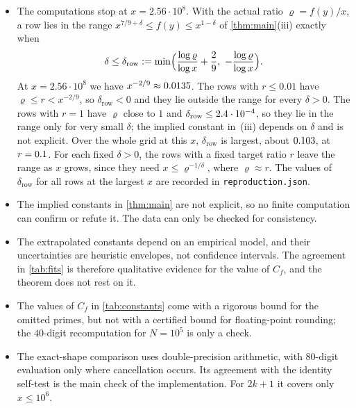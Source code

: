 \begin{itemize}
\item The computations stop at $x=2.56\cdot10^8$. With the actual ratio $\varrho=f(y)/x$, a row lies in the range $x^{7/9+\delta}\le f(y)\le x^{1-\delta}$ of \cref{thm:main}(iii) exactly when
\[
\delta\le\delta_{\mathrm{row}}:=\min\Bigl(\frac{\log\varrho}{\log x}+\frac29,\ -\frac{\log\varrho}{\log x}\Bigr).
\]
At $x=2.56\cdot10^8$ we have $x^{-2/9}\approx0.0135$. The rows with $r\le0.01$ have $\varrho\le r<x^{-2/9}$, so $\delta_{\mathrm{row}}<0$ and they lie outside the range for every $\delta>0$. The rows with $r=1$ have $\varrho$ close to $1$ and $\delta_{\mathrm{row}}\le2.4\cdot 10^{-4}$, so they lie in the range only for very small $\delta$; the implied constant in~(iii) depends on $\delta$ and is not explicit. Over the whole grid at this $x$, $\delta_{\mathrm{row}}$ is largest, about $0.103$, at $r=0.1$. For each fixed $\delta>0$, the rows with a fixed target ratio $r$ leave the range as $x$ grows, since they need $x\le\varrho^{-1/\delta}$, where $\varrho\approx r$. The values of $\delta_{\mathrm{row}}$ for all rows at the largest $x$ are recorded in \texttt{reproduction.json}.
\item The implied constants in \cref{thm:main} are not explicit, so no finite computation can confirm or refute it. The data can only be checked for consistency.
\item The extrapolated constants depend on an empirical model, and their uncertainties are heuristic envelopes, not confidence intervals. The agreement in \cref{tab:fits} is therefore qualitative evidence for the value of $C_f$, and the theorem does not rest on it.
\item The values of $C_f$ in \cref{tab:constants} come with a rigorous bound for the omitted primes, but not with a certified bound for floating-point rounding; the $40$-digit recomputation for $N=10^5$ is only a check.
\item The exact-shape comparison uses double-precision arithmetic, with $80$-digit evaluation only where cancellation occurs. Its agreement with the identity self-test is the main check of the implementation. For $2k+1$ it covers only $x\le10^6$.
\end{itemize}
